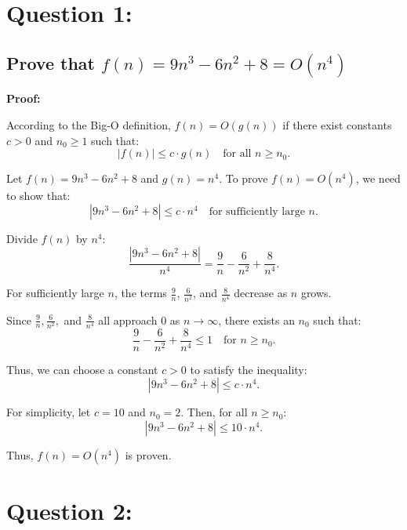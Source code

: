 \documentclass{article}
\begin{document}
\section*{Question 1:}
\subsection*{Prove that \( f(n) = 9n^3 - 6n^2 + 8 = O(n^4) \) }
\textbf{Proof:}

According to the Big-O definition, \( f(n) = O(g(n)) \) if there exist constants \( c > 0 \) and \( n_0 \geq 1 \) such that:
\[
|f(n)| \leq c \cdot g(n) \quad \text{for all } n \geq n_0.
\]

Let \( f(n) = 9n^3 - 6n^2 + 8 \) and \( g(n) = n^4 \). To prove \( f(n) = O(n^4) \), we need to show that:
\[
|9n^3 - 6n^2 + 8| \leq c \cdot n^4 \quad \text{for sufficiently large } n.
\]

Divide \( f(n) \) by \( n^4 \):
\[
\frac{|9n^3 - 6n^2 + 8|}{n^4} = \frac{9}{n} - \frac{6}{n^2} + \frac{8}{n^4}.
\]

For sufficiently large \( n \), the terms \( \frac{9}{n} \), \( \frac{6}{n^2} \), and \( \frac{8}{n^4} \) decrease as \( n \) grows.

Since \( \frac{9}{n}, \frac{6}{n^2}, \) and \( \frac{8}{n^4} \) all approach \( 0 \) as \( n \to \infty \), there exists an \( n_0 \) such that:
\[
\frac{9}{n} - \frac{6}{n^2} + \frac{8}{n^4} \leq 1 \quad \text{for } n \geq n_0.
\]

Thus, we can choose a constant \( c > 0 \) to satisfy the inequality:
\[
|9n^3 - 6n^2 + 8| \leq c \cdot n^4.
\]

For simplicity, let \( c = 10 \) and \( n_0 = 2 \). Then, for all \( n \geq n_0 \):
\[
|9n^3 - 6n^2 + 8| \leq 10 \cdot n^4.
\]

Thus, \( f(n) = O(n^4) \) is proven.

\pagebreak
\section*{Question 2:}
\end{document}
